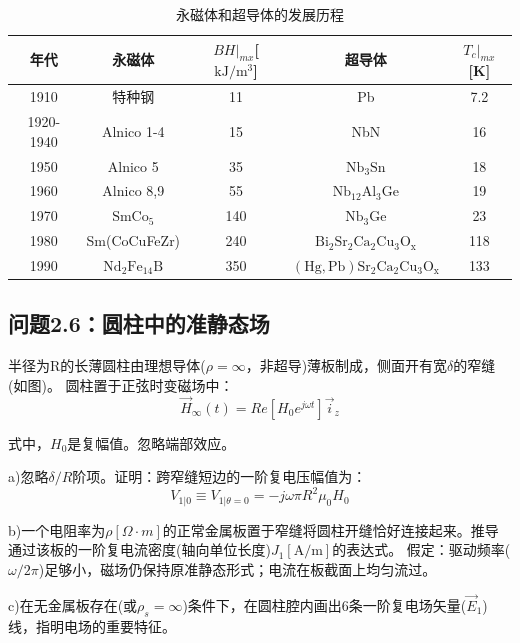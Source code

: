 \begin{table}[htbp]
\centering
\caption{永磁体和超导体的发展历程}
\label{磁体和超导体的发展}
\begin{tabular}{|c|c|c|c|c|}
\hline
年代        & 永磁体 & $BH|_{mx}$[$\mathrm{kJ/m^3}$] & 超导体 & $T_c|_{mx}$[K]   \\ \hline
1910      &  特种钢   & 11       &  Pb   & 7.2 \\ \hline
1920-1940 &  Alnico 1-4   & 15       &   NbN  & 16  \\ \hline
1950      &   Alnico 5  & 35       &    $\mathrm{Nb_3 Sn}$ & 18  \\ \hline
1960      &   Alnico 8,9  & 55       &   $\mathrm{Nb_{12}Al_3 Ge}$  &   19  \\ \hline
1970      &   $\mathrm{SmCo_5} $  & 140      &  $\mathrm{Nb_3Ge}$   & 23    \\ \hline
1980      &   Sm(CoCuFeZr)  & 240      &  $\mathrm{Bi_2 Sr_2 Ca_2 Cu_3 O_x}$   & 118 \\ \hline
1990      &  $\mathrm{Nd_2Fe_{14}B}$   & 350      & $\mathrm{(Hg, Pb) Sr_2 Ca_2 Cu_3 O_x}$    & 133 \\ \hline
\end{tabular}
\end{table}



\subsection{问题2.6：圆柱中的准静态场}
半径为R的长薄圆柱由理想导体($\rho=\infty$，非超导)薄板制成，侧面开有宽$\delta$的窄缝(如图)。
圆柱置于正弦时变磁场中：
\begin{equation}
\vec{H}_\infty(t)=Re[H_0 e^{j\omega t}] \vec{i}_z
\end{equation}

式中，$H_0$是复幅值。忽略端部效应。

a)忽略$\delta/R$阶项。证明：跨窄缝短边的一阶复电压幅值为：
\begin{equation}
V_{1|0}\equiv V_{1|\theta=0}=-j\omega \pi R^2 \mu_0 H_0
\end{equation}

b)一个电阻率为$\rho[\Omega\cdot m]$的正常金属板置于窄缝将圆柱开缝恰好连接起来。推导通过该板的一阶复电流密度(轴向单位长度)$J_1 [\mathrm{A/m}]$的表达式。
假定：驱动频率($\omega/2\pi$)足够小，磁场仍保持原准静态形式；电流在板截面上均匀流过。

c)在无金属板存在(或$\rho_s=\infty$)条件下，在圆柱腔内画出6条一阶复电场矢量($\vec{E}_1$)线，指明电场的重要特征。

